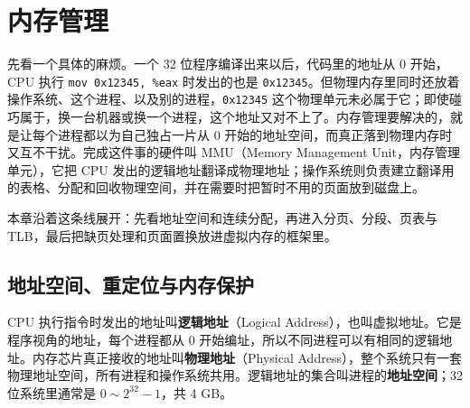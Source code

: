 \section{内存管理}

先看一个具体的麻烦。一个 32 位程序编译出来以后，代码里的地址从 0 开始，CPU 执行 \texttt{mov 0x12345, \%eax} 时发出的也是 \texttt{0x12345}。但物理内存里同时还放着操作系统、这个进程、以及别的进程，\texttt{0x12345} 这个物理单元未必属于它；即使碰巧属于，换一台机器或换一个进程，这个地址又对不上了。内存管理要解决的，就是让每个进程都以为自己独占一片从 0 开始的地址空间，而真正落到物理内存时又互不干扰。完成这件事的硬件叫 MMU（Memory Management Unit，内存管理单元），它把 CPU 发出的逻辑地址翻译成物理地址；操作系统则负责建立翻译用的表格、分配和回收物理空间，并在需要时把暂时不用的页面放到磁盘上。

本章沿着这条线展开：先看地址空间和连续分配，再进入分页、分段、页表与 TLB，最后把缺页处理和页面置换放进虚拟内存的框架里。

\subsection{地址空间、重定位与内存保护}

CPU 执行指令时发出的地址叫\textbf{逻辑地址}（Logical Address），也叫虚拟地址。它是程序视角的地址，每个进程都从 0 开始编址，所以不同进程可以有相同的逻辑地址。内存芯片真正接收的地址叫\textbf{物理地址}（Physical Address），整个系统只有一套物理地址空间，所有进程和操作系统共用。逻辑地址的集合叫进程的\textbf{地址空间}；32 位系统里通常是 $0\sim 2^{32}-1$，共 4 GB。

